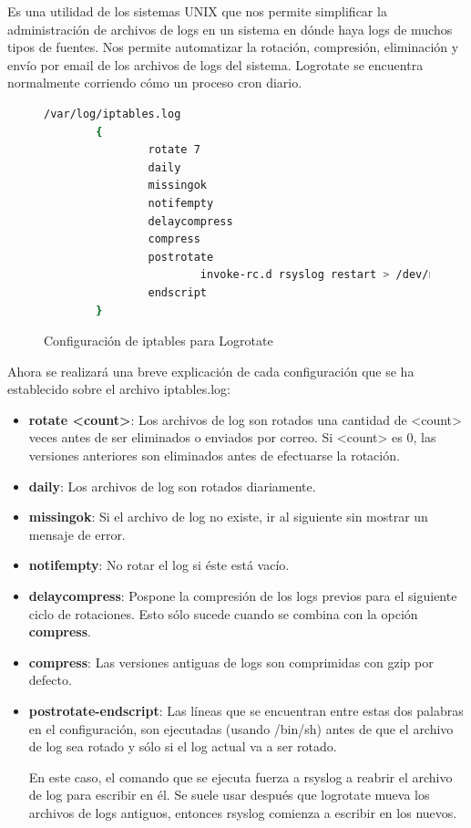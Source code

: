 Es una utilidad de los sistemas UNIX que nos permite simplificar la administración de archivos de logs en un sistema en dónde haya logs de muchos tipos de fuentes. Nos permite automatizar la rotación, compresión, eliminación y envío por email de los archivos de logs del sistema. Logrotate se encuentra normalmente corriendo cómo un proceso cron diario. \\

\begin{figure}[H]
\begin{lstlisting}[language=bash]
/var/log/iptables.log
        {
                rotate 7
                daily
                missingok
                notifempty
                delaycompress
                compress
                postrotate
                        invoke-rc.d rsyslog restart > /dev/null
                endscript
        }
\end{lstlisting}
\caption{Configuración de iptables para Logrotate}
\end{figure}

Ahora se realizará una breve explicación de cada configuración que se ha establecido sobre el archivo iptables.log:

\begin{itemize}
\item \textbf{rotate <count>}: Los archivos de log son rotados una cantidad de <count> veces antes de ser eliminados o enviados por correo. Si <count> es 0, las versiones anteriores son eliminados antes de efectuarse la rotación.
\item \textbf{daily}: Los archivos de log son rotados diariamente.
\item \textbf{missingok}: Si el archivo de log no existe, ir al siguiente sin mostrar un mensaje de error.
\item \textbf{notifempty}: No rotar el log si éste está vacío.
\item \textbf{delaycompress}: Pospone la compresión de los logs previos para el siguiente ciclo de rotaciones. Esto sólo sucede cuando se combina con la opción \textbf{compress}.
\item \textbf{compress}: Las versiones antiguas de logs son comprimidas con gzip por defecto.
\item \textbf{postrotate-endscript}: Las líneas que se encuentran entre estas dos palabras en el configuración, son ejecutadas (usando /bin/sh) antes de que el archivo de log sea rotado y sólo si el log actual va a ser rotado.

  En este caso, el comando que se ejecuta fuerza a rsyslog a reabrir el archivo de log para escribir en él. Se suele usar después que logrotate mueva los archivos de logs antiguos, entonces rsyslog comienza a escribir en los nuevos.
\end{itemize}

